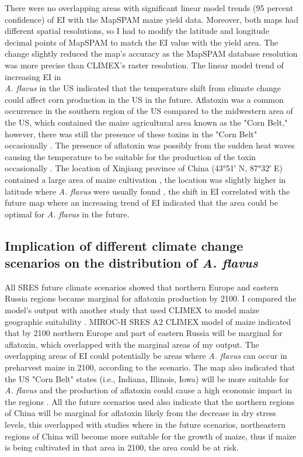  There were no overlapping areas with significant linear model trends (95 percent confidence) of EI with the MapSPAM maize yield data. Moreover, both maps had different spatial resolutions, so I had to modify the latitude and longitude decimal points of MapSPAM to match the EI value with the yield area. The change slightly reduced the map's accuracy as the MapSPAM database resolution was more precise than CLIMEX's raster resolution. The linear model trend of increasing EI in \\ \textit{A. flavus} in the US indicated that the temperature shift from climate change could affect corn production in the US in the future. Aflatoxin was a common occurrence in the southern region of the US compared to the midwestern area of the US, which contained the maize agricultural area known as the "Corn Belt," however, there was still the presence of these toxins in the "Corn Belt" occasionally \citep{yu2022climate}. The presence of aflatoxin was possibly from the sudden heat waves causing the temperature to be suitable for the production of the toxin occasionally \citep{an1980factors} . The location of Xinjiang province of China (43°51′ N, 87°32′ E)  contained a large area of maize cultivation \citep{wang2011changes}, the location was slightly higher in latitude where \textit{A. flavus} were usually found \citep{ehrlich2014non}, the shift in EI correlated with the future map where an increasing trend of EI indicated that the area could be optimal for \textit{A. flavus} in the future.

\subsection{Implication of different climate change scenarios on the distribution of \textit{A. flavus}}

All SRES future climate scenarios showed that northern Europe and eastern Russia regions became marginal for aflatoxin production by 2100. I compared the model's output with another study that used CLIMEX to model maize geographic suitability \citep{ramirez2017global}. MIROC-H SRES A2 CLIMEX model of maize indicated that by 2100 northern Europe and part of eastern Russia will be marginal for aflatoxin, which overlapped with the marginal areas of my output. The overlapping areas of EI could potentially be areas where \textit{A. flavus} can occur in preharvest maize in 2100, according to the scenario. The map also indicated that the US "Corn Belt" states (i.e., Indiana, Illinois, Iowa) will be more suitable for \textit{A. flavus} and the production of aflatoxin could cause a high economic impact in the regions \citep{mitchell2016potential}. All the future scenarios used also indicate that the northern regions of China will be marginal for aflatoxin likely from the decrease in dry stress levels, this overlapped with \citep{mitchell2016potential} studies where in the future scenarios, northeastern regions of China will become more suitable for the growth of maize, thus if maize is being cultivated in that area in 2100, the area could be at risk.  


